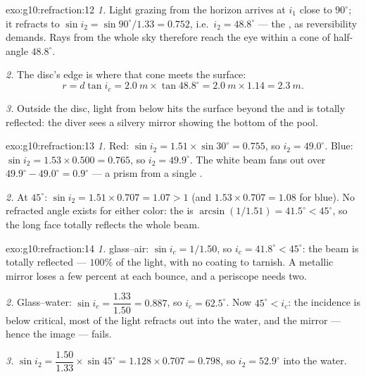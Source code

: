 \begin{solution}{exo:g10:refraction:12}
\emph{1.} Light grazing from the horizon arrives at $i_1$ close to
$90^\circ$; it refracts to $\sin i_2 = \sin 90^\circ / 1.33 = 0.752$,
i.e.\ $i_2 = 48.8^\circ$ --- the , as reversibility
demands. Rays from the whole sky therefore reach the eye within a cone
of half-angle $48.8^\circ$.

\emph{2.} The disc's edge is where that cone meets the surface:
\[
r = d \tan i_c = \qty{2.0}{m} \times \tan 48.8^\circ
= \qty{2.0}{m} \times 1.14 = \qty{2.3}{m}.
\]

\emph{3.} Outside the disc, light from below hits the surface beyond
the  and is totally reflected: the diver sees a silvery
mirror showing the bottom of the pool.
\end{solution}

\begin{solution}{exo:g10:refraction:13}
\emph{1.} Red: $\sin i_2 = 1.51 \times \sin 30^\circ = 0.755$, so
$i_2 = 49.0^\circ$. Blue: $\sin i_2 = 1.53 \times 0.500 = 0.765$, so
$i_2 = 49.9^\circ$. The white beam fans out over
$49.9^\circ - 49.0^\circ = 0.9^\circ$ --- a prism  from a
single .

\emph{2.} At $45^\circ$: $\sin i_2 = 1.51 \times 0.707 = 1.07 > 1$
(and $1.53 \times 0.707 = 1.08$ for blue). No refracted angle exists
for either color: the  is
$\arcsin(1/1.51) = 41.5^\circ < 45^\circ$, so the long face totally
reflects the whole beam.
\end{solution}

\begin{solution}{exo:g10:refraction:14}
\emph{1.}  glass--air: $\sin i_c = 1/1.50$, so
$i_c = 41.8^\circ < 45^\circ$: the beam is totally reflected --- $100\%$
of the light, with no coating to tarnish. A metallic mirror loses a few
percent at each bounce, and a periscope needs two.

\emph{2.} Glass--water: $\sin i_c = \dfrac{1.33}{1.50} = 0.887$, so
$i_c = 62.5^\circ$. Now $45^\circ < i_c$: the incidence is below
critical, most of the light refracts out into the water, and the
mirror --- hence the image --- fails.

\emph{3.} $\sin i_2 = \dfrac{1.50}{1.33} \times \sin 45^\circ
= 1.128 \times 0.707 = 0.798$, so $i_2 = 52.9^\circ$ into the water.
\end{solution}

